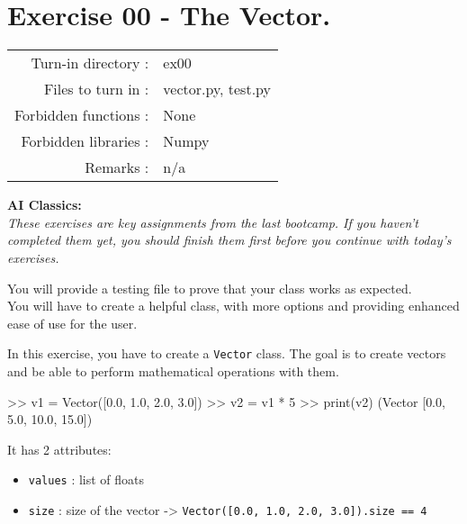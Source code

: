 \documentclass[]{article}
\newenvironment{Shaded}{\begin{snugshade}}{\end{snugshade}}
\newcommand{\BuiltInTok}[1]{\textcolor[rgb]{0.50,0.55,0.55}{#1}}
\newcommand{\DecValTok}[1]{\textcolor[rgb]{0.96,0.45,0.00}{#1}}
\newcommand{\FloatTok}[1]{\textcolor[rgb]{0.96,0.45,0.00}{#1}}
\newcommand{\NormalTok}[1]{\textcolor[rgb]{0.81,0.81,0.76}{#1}}
\newcommand{\OperatorTok}[1]{\textcolor[rgb]{0.81,0.81,0.76}{#1}}
\begin{document}
\clearpage

\hypertarget{exercise-00---the-vector.}{%
\section{Exercise 00 - The Vector.}\label{exercise-00---the-vector.}}

\begin{longtable}[]{@{}rl@{}}
\toprule
\endhead
Turn-in directory : & ex00\tabularnewline
Files to turn in : & vector.py, test.py\tabularnewline
Forbidden functions : & None\tabularnewline
Forbidden libraries : & Numpy\tabularnewline
Remarks : & n/a\tabularnewline
\bottomrule
\end{longtable}

\textbf{AI Classics:}\\
\emph{These exercises are key assignments from the last bootcamp. If you
haven't completed them yet, you should finish them first before you
continue with today's exercises.}

You will provide a testing file to prove that your class works as
expected.\\
You will have to create a helpful class, with more options and providing
enhanced ease of use for the user.

In this exercise, you have to create a \texttt{Vector} class. The goal
is to create vectors and be able to perform mathematical operations with
them.

\begin{Shaded}
\begin{Highlighting}[]
\OperatorTok{>>}\NormalTok{ v1 }\OperatorTok{=}\NormalTok{ Vector([}\FloatTok{0.0}\NormalTok{, }\FloatTok{1.0}\NormalTok{, }\FloatTok{2.0}\NormalTok{, }\FloatTok{3.0}\NormalTok{])}
\OperatorTok{>>}\NormalTok{ v2 }\OperatorTok{=}\NormalTok{ v1 }\OperatorTok{*} \DecValTok{5}
\OperatorTok{>>} \BuiltInTok{print}\NormalTok{(v2)}
\NormalTok{(Vector [}\FloatTok{0.0}\NormalTok{, }\FloatTok{5.0}\NormalTok{, }\FloatTok{10.0}\NormalTok{, }\FloatTok{15.0}\NormalTok{])}
\end{Highlighting}
\end{Shaded}

It has 2 attributes:

\begin{itemize}
\item
  \texttt{values} : list of floats
\item
  \texttt{size} : size of the vector -\textgreater{}
  \texttt{Vector({[}0.0,\ 1.0,\ 2.0,\ 3.0{]}).size\ ==\ 4}
\end{itemize}
\end{document}
